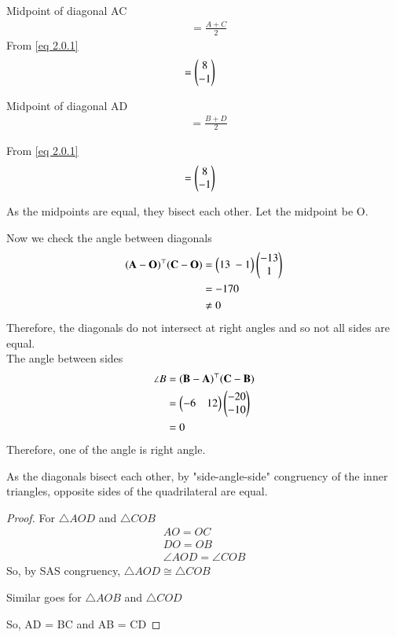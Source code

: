 \documentclass[journal,12pt,twocolumn]{IEEEtran}
\begin{document}
Midpoint of diagonal AC 
\begin{align}
    &= \frac{A+C}{2}
\end{align}
From \eqref{eq 2.0.1}
\begin{align}
    &= \begin{pmatrix}8 \\ -1\end{pmatrix}
\end{align}

Midpoint of diagonal AD 
\begin{align}
    &= \frac{B+D}{2}
\end{align}

From \eqref{eq 2.0.1}
\begin{align}
    &= \begin{pmatrix}8 \\ -1\end{pmatrix}
\end{align}

As the midpoints are equal, they bisect each other. Let the midpoint be O.

Now we check the angle between diagonals
\begin{align}
    (\vec{A}-\vec{O})^\top(\vec{C}-\vec{O})&= \myvec{13\ -1}\myvec{-13 \\ 1}\\
    &= -170 \\
    & \ne 0
\end{align}
Therefore, the diagonals do not intersect at right angles and so not all sides are equal.\\
The angle between sides 
\begin{align}
    \angle B &= (\mathbf{\mathbf{B} - \mathbf{A}})^\top(\mathbf{\mathbf{C} - \mathbf{B}}) \\ 
    &= \begin{pmatrix}-6 & 12\end{pmatrix} \begin{pmatrix}-20 \\ -10\end{pmatrix}\\
    &= 0
\end{align}
Therefore, one of the angle is right angle.
\begin{lemma}

As the diagonals bisect each other, by "side-angle-side" congruency of the inner triangles, opposite sides of the quadrilateral are equal.
\end{lemma}

\begin{proof}
For $\triangle AOD$ and $\triangle COB$
\begin{align}
    AO = OC\\
    DO = OB\\
    \angle AOD = \angle COB
\end{align}
So, by SAS congruency, $\triangle AOD \cong \triangle COB$

Similar goes for $\triangle AOB$ and $\triangle COD$

So, AD = BC and AB = CD
\end{proof}
\end{document}
